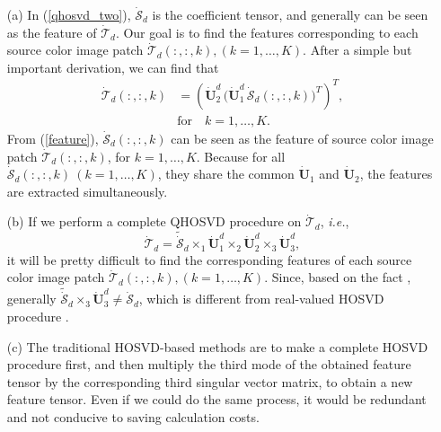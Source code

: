 \documentclass[journal]{IEEEtran}
\begin{document}
\begin{enumerate}
	\item[(a)]
 In (\ref{qhosvd_two}), $\dot{\mathcal{S}}_{d}$ is the coefficient tensor, and generally can be seen as the feature of $\dot{\mathcal{T}}_{d}$. Our goal is to find the features corresponding to each source color image patch $\dot{\mathcal{T}}_{d}(:,:,k), (k=1, \ldots, K)$. After a simple but important derivation, we can find that
	\begin{equation}
	\label{feature}
		\begin{split}
	\dot{\mathcal{T}}_{d}(:,:,k)&=\left(\dot{\mathbf{U}}_{2}^{d}\,\big(\dot{\mathbf{U}}_{1}^{d}\,\dot{\mathcal{S}}_{d}(:,:,k)\big)^{T}\right)^{T},\\& \text{for} \quad k=1, \ldots, K.
		\end{split}
	\end{equation}
From (\ref{feature}), $\dot{\mathcal{S}}_{d}(:,:,k)$ can be seen as the feature of source color image patch $\dot{\mathcal{T}}_{d}(:,:,k)$, for $k=1, \ldots, K$.  Because for all $\dot{\mathcal{S}}_{d}(:,:,k) \ (k=1, \ldots, K)$, they share the common $\dot{\mathbf{U}}_{1}$ and $\dot{\mathbf{U}}_{2}$, the features are extracted simultaneously.
\item[(b)] If we perform a complete QHOSVD procedure on $\dot{\mathcal{T}}_{d}$, \emph{i.e.},
\begin{equation}
\label{qhosvd_three}
\dot{\mathcal{T}}_{d}=\tilde{\dot{\mathcal{S}}}_{d}\times_{1}\dot{\mathbf{U}}_{1}^{d}\times_{2}\dot{\mathbf{U}}_{2}^{d}\times_{3}\dot{\mathbf{U}}_{3}^{d},
\end{equation}
 it will be pretty difficult to find the corresponding features of each source color image patch $\dot{\mathcal{T}}_{d}(:,:,k), (k=1, \ldots, K)$. Since, based on the fact , generally $\tilde{\dot{\mathcal{S}}}_{d}\times_{3}\dot{\mathbf{U}}_{3}^{d}\neq\dot{\mathcal{S}}_{d}$, which is different from real-valued HOSVD procedure \cite{DBLP:journals/siammax/LathauwerMV00}.
 \item[(c)] The traditional HOSVD-based methods \cite{DBLP:journals/tip/LiangHLZ12,DBLP:journals/jvcir/LuoZZW17}  are to make a complete HOSVD  procedure first, and then multiply the third mode of the obtained feature tensor by the corresponding third singular vector matrix, to obtain a new feature tensor. Even if we could do the same process, it would be redundant and not conducive to saving calculation costs.
\end{enumerate}
\end{document}
